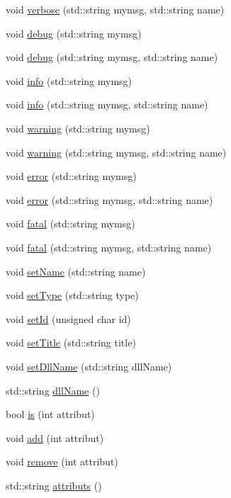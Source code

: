 \begin{DoxyCompactItemize}
void \hyperlink{classObject_a2d4120195317e2a3c6532e8bb9f3da68}{verbose} (std::string mymsg, std::string name)
\item 
void \hyperlink{classObject_aac010553f022165573714b7014a15f0d}{debug} (std::string mymsg)
\item 
void \hyperlink{classObject_a6c9a0397ca804e04d675ed05683f5420}{debug} (std::string mymsg, std::string name)
\item 
void \hyperlink{classObject_a644fd329ea4cb85f54fa6846484b84a8}{info} (std::string mymsg)
\item 
void \hyperlink{classObject_a1ca123253dfd30fc28b156f521dcbdae}{info} (std::string mymsg, std::string name)
\item 
void \hyperlink{classObject_a65cd4fda577711660821fd2cd5a3b4c9}{warning} (std::string mymsg)
\item 
void \hyperlink{classObject_a11f101db4dd73d9391b0231818881d86}{warning} (std::string mymsg, std::string name)
\item 
void \hyperlink{classObject_a204a95f57818c0f811933917a30eff45}{error} (std::string mymsg)
\item 
void \hyperlink{classObject_ad7f6c457733082efa2f9ff5f5c8e119a}{error} (std::string mymsg, std::string name)
\item 
void \hyperlink{classObject_aad5a16aac7516ce65bd5ec02ab07fc80}{fatal} (std::string mymsg)
\item 
void \hyperlink{classObject_ae62acd3d09f716220f75f252dc38bc9a}{fatal} (std::string mymsg, std::string name)
\item 
void \hyperlink{classObject_ae30fea75683c2d149b6b6d17c09ecd0c}{setName} (std::string name)
\item 
void \hyperlink{classObject_aae534cc9d982bcb9b99fd505f2e103a5}{setType} (std::string type)
\item 
void \hyperlink{classObject_a398fe08cba594a0ce6891d59fe4f159f}{setId} (unsigned char id)
\item 
void \hyperlink{classObject_a89557dbbad5bcaa02652f5d7fa35d20f}{setTitle} (std::string title)
\item 
void \hyperlink{classObject_a870c5af919958c2136623b2d7816d123}{setDllName} (std::string dllName)
\item 
std::string \hyperlink{classObject_a2e3947f2870094c332d7454117f3ec63}{dllName} ()
\item 
bool \hyperlink{classAttrib_a704f26af560909ad22065083bb7d4c34}{is} (int attribut)
\item 
void \hyperlink{classAttrib_a235f773af19c900264a190b00a3b4ad7}{add} (int attribut)
\item 
void \hyperlink{classAttrib_a7d4ef7e32d93cb287792b87b857e79f3}{remove} (int attribut)
\item 
std::string \hyperlink{classAttrib_aee7bbf16b144887f196e1341b24f8a26}{attributs} ()
\end{DoxyCompactItemize}
